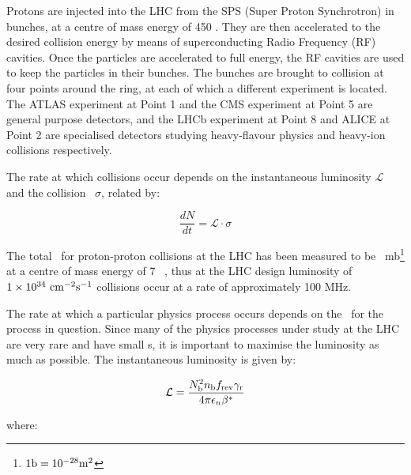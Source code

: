 Protons are injected into the LHC from the SPS (Super Proton Synchrotron) in
bunches, at a centre of mass energy of 450 \GeV. They are then accelerated to the desired
collision energy by means of superconducting Radio Frequency (RF) cavities. Once the
particles are accelerated to full energy, the RF cavities are used to keep the
particles in their bunches. The bunches are brought to collision at four points
around the ring, at each of which a different experiment is located. The ATLAS
experiment at Point 1 and the CMS experiment at Point 5 are general purpose
detectors, and the LHCb experiment at Point 8 and ALICE at Point 2 are
specialised detectors studying heavy-flavour physics and heavy-ion collisions
respectively.


The rate at which collisions occur depends on the instantaneous luminosity
$\mathcal{L}$ and the collision \cx\ $\sigma$, related by:

\begin{equation}
\frac{dN}{dt} = \mathcal{L} \cdot \sigma
\end{equation}

The total \cx\ for
proton-proton collisions at the LHC has been measured to be
~mb\footnote{$1 \rm{b} = 10^{-28}
m^{2}$} at a centre of mass energy of 7 \tev~\cite{0295-5075-96-2-21002}, thus
at the LHC design luminosity of $1 \times 10^{34}~\rm{cm}^{-2}\rm{s}^{-1}$
collisions occur at a rate of approximately 100 MHz. 

The rate at which a particular
physics process occurs depends on the \cx\ for the process in question.
Since many of the physics processes under study at the LHC are very rare and
have small \cx s, it is important to maximise the luminosity as much as
possible. The instantaneous luminosity is given by:

\begin{equation}
\mathcal{L} = \frac{N_{\rm{b}}^{2}n_{\rm{b}}f_{\rm{rev}}\gamma_{\rm{r}}}{4\pi
\epsilon_{n}\beta^{*}}
\end{equation}

where:


